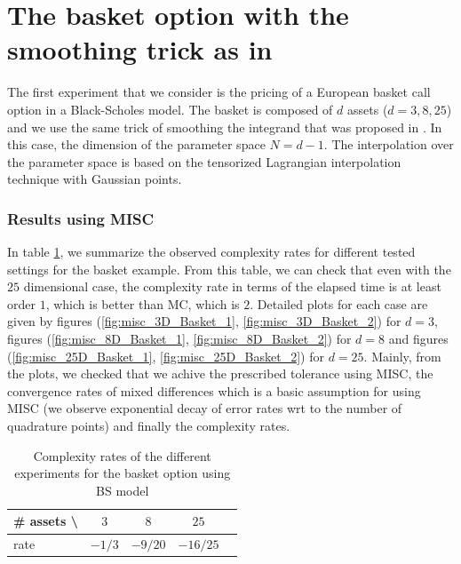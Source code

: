 \documentclass[11pt]{article}
\begin{document}
\section{The basket option with the smoothing trick as in \cite{bayersmoothing}}\label{sec:The basket option with smoothing trick with a time stepping procedure}

The first experiment that we consider is the pricing of  a European  basket call option in a Black-Scholes model. The basket is composed of $d$ assets ($d=3,8,25$) and we use the same trick of smoothing the integrand that was proposed in \cite{bayersmoothing}. In this case, the dimension of the parameter space $N=d-1$. The interpolation over the parameter space is based on the tensorized Lagrangian interpolation technique with Gaussian  points.


\subsubsection{Results using MISC}
In table \ref{table: Complexity rates of the different experiemnts  for the basket option using BS model}, we summarize the observed  complexity rates for different tested settings for the basket example. From this table, we can check that even with the $25$ dimensional case, the complexity rate in terms of the elapsed time is at least order $1$, which is better than MC, which is $2$. Detailed plots for each case are given by figures (\ref{fig:misc_3D_Basket_1}, \ref{fig:misc_3D_Basket_2}) for $d=3$, figures (\ref{fig:misc_8D_Basket_1}, \ref{fig:misc_8D_Basket_2}) for $d=8$ and figures (\ref{fig:misc_25D_Basket_1}, \ref{fig:misc_25D_Basket_2}) for $d=25$. Mainly, from the plots, 
we checked  that we achive the prescribed tolerance using MISC, the convergence rates of mixed differences which is a basic assumption for using MISC (we observe exponential decay of error rates wrt to the number of quadrature points) and finally the complexity rates.


\begin{table}[h!]
	\centering
	\begin{tabular}{l*{3}{c}r}
		\# assets  \textbackslash          & $3$ & $8$ & $25$   \\
		\hline
		rate   & $-1/3$ & $-9/20$ & $-16/25$  \\
		\hline
	\end{tabular}
	\caption{Complexity rates of the different experiments  for the basket option using BS model}
	\label{table: Complexity rates of the different experiemnts  for the basket option using BS model}
\end{table}	
\newpage
\end{document}
